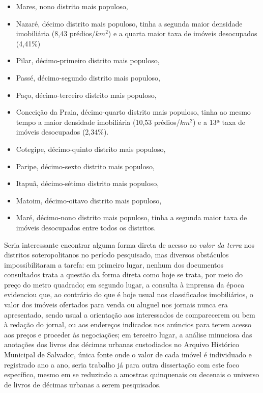 \begin{itemize}
 \item Mares, nono distrito mais populoso,
 \item Nazaré, décimo distrito mais populoso, tinha a segunda maior densidade imobiliária (8,43 prédios/$km^{2}$) e a quarta maior taxa de imóveis desocupados (4,41\%)
 \item Pilar, décimo-primeiro distrito mais populoso,
 \item Passé, décimo-segundo distrito mais populoso,
 \item Paço, décimo-terceiro distrito mais populoso,
 \item Conceição da Praia, décimo-quarto distrito mais populoso, tinha ao mesmo tempo a maior densidade imobiliária (10,53 prédios/$km^{2}$) e a 13ª taxa de imóveis desocupados (2,34\%).
 \item Cotegipe, décimo-quinto distrito mais populoso,
 \item Paripe, décimo-sexto distrito mais populoso,
 \item Itapuã, décimo-sétimo distrito mais populoso,
 \item Matoim, décimo-oitavo distrito mais populoso,
 \item Maré, décimo-nono distrito mais populoso, tinha a segunda maior taxa de imóveis desocupados entre todos os distritos.
\end{itemize}




Seria interessante encontrar alguma forma direta de acesso ao \textit{valor da terra} nos distritos soteropolitanos no período pesquisado, mas diversos obstáculos impossibilitaram a tarefa: em primeiro lugar, nenhum dos documentos consultados trata a questão da forma direta como hoje se trata, por meio do preço do metro quadrado; em segundo lugar, a consulta à imprensa da época evidenciou que, ao contrário do que é hoje usual nos classificados imobiliários, o valor dos imóveis ofertados para venda ou aluguel nos jornais nunca era apresentado, sendo usual a orientação aos interessados de comparecerem ou bem à redação do jornal, ou aos endereços indicados nos anúncios para terem acesso aos preços e proceder às negociações; em terceiro lugar, a análise minuciosa das anotações dos livros das décimas urbanas custodiados no Arquivo Histórico Municipal de Salvador, única fonte onde o valor de cada imóvel é individuado e registrado ano a ano, seria trabalho já para outra dissertação com este foco específico, mesmo em se reduzindo a amostras quinquenais ou decenais o universo de livros de décimas urbanas a serem pesquisados.

